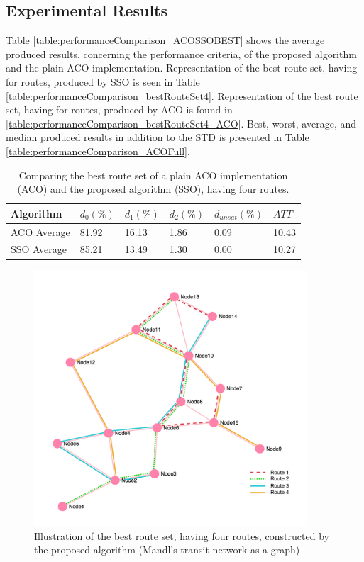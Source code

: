 \subsection{Experimental Results}
\label{subsec:performanceComparison_results}


Table \vref{table:performanceComparison_ACOSSOBEST} shows the average produced results, concerning the performance criteria, of the proposed algorithm and the plain ACO implementation. Representation of the best route set, having for routes, produced by SSO is seen in Table \vref{table:performanceComparison_bestRouteSet4}.  Representation of the best route set, having for routes, produced by ACO is found in \vref{table:performanceComparison_bestRouteSet4_ACO}. Best, worst, average, and median produced results in addition to the STD is presented in Table \vref{table:performanceComparison_ACOFull}.

    \begin{table}[H]
    \centering
    \begin{tabular}{|l||l|l|l|l|l|}
    \hline
    Algorithm & $d_0(\%)$ & $d_1(\%)$ & $d_2(\%)$ & $d_{unsat}(\%)$ & $ATT$ \\
    \hline
    ACO Average & 81.92 & 16.13 & 1.86 & 0.09 & 10.43\\
    \hline
    SSO Average & 85.21 & 13.49 & 1.30 & 0.00 & 10.27\\
    \hline
    \end{tabular}
    \caption {Comparing the best route set of a plain ACO implementation (ACO) and the proposed algorithm (SSO), having four routes.}
    \label{table:performanceComparison_ACOSSOBEST}
    \end{table}

   

\begin{figure}[H]
    \begin{center}
    \includegraphics[width=4in]{assets/mandlnetwork_4routes.png}
    \end{center}
    \caption{Illustration of the best route set, having four routes, constructed by the proposed algorithm (Mandl's transit network as a graph)}
    \label{fig:bestRouteSet4} 
\end{figure}

